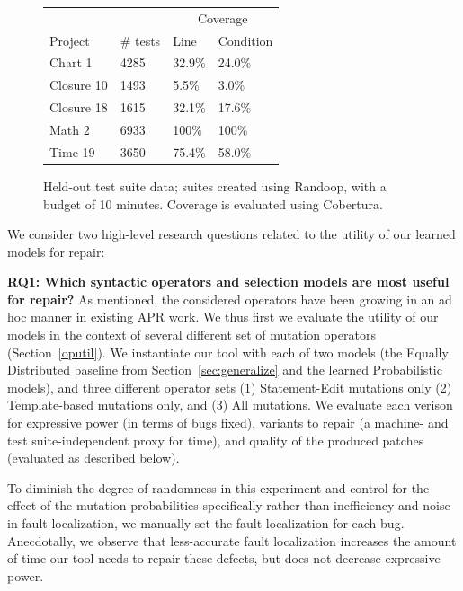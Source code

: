 \documentclass[conference]{IEEEtran}
\begin{document}
\begin{figure}
\centering
\begin{tabular}{llll}
\toprule
         &             & \multicolumn{2}{c}{Coverage} \\
Project & \# tests & Line & Condition \\
\midrule
Chart 1 & 4285 & 32.9\% & 24.0\% \\
Closure 10 & 1493 & 5.5\% & 3.0\% \\
Closure 18 & 1615 & 32.1\% & 17.6\% \\
Math 2 & 6933 & 100\% & 100\% \\
Time 19 & 3650 & 75.4\% & 58.0\% \\
\bottomrule
\end{tabular}
\caption{Held-out test suite data; suites created using Randoop, with a budget
  of 10 minutes. Coverage is evaluated using Cobertura.}
\label{heldOut}
\end{figure}    


We consider two high-level research questions related to the utility of our
learned models for repair: 

\vspace{1ex}
\noindent\textbf{RQ1: Which syntactic operators and selection models are most useful for repair?}  As
  mentioned, the considered operators have been growing in an ad hoc manner in
  existing APR work.  We thus first we evaluate the utility of our models in the
  context of several different set of mutation operators (Section~\ref{oputil}). We
instantiate our tool with each of 
two models (the Equally Distributed baseline from Section~\ref{sec:generalize}
and the learned Probabilistic models), and three different operator sets (1) Statement-Edit mutations only (2)
Template-based mutations only, and (3) All mutations. We evaluate each verison
for expressive power (in terms of bugs fixed), variants to repair (a machine-
and test suite-independent proxy for time), and quality of the produced patches
(evaluated as described below). 

To diminish the degree of randomness in this experiment and control for the
effect of the mutation probabilities specifically rather than inefficiency and
noise in fault localization, we manually set the fault localization for each
bug. Anecdotally, we observe that less-accurate fault localization increases the
amount of time our tool needs to repair these defects, but does not decrease expressive
power.  
\end{document}

